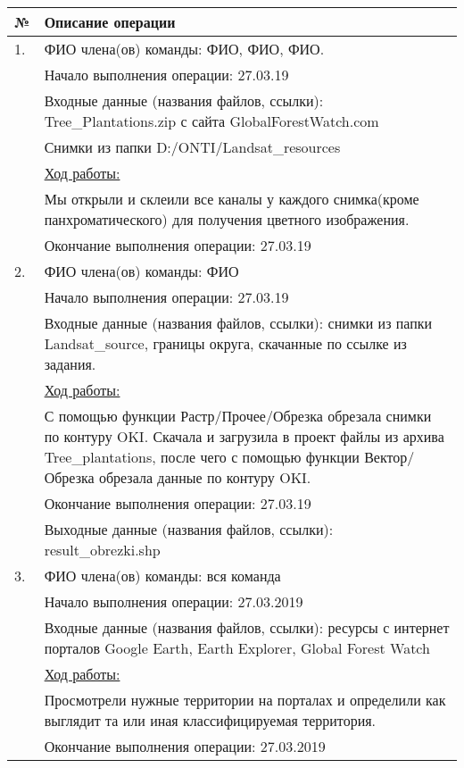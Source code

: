 \begin{center}
    \begin{longtable}{|l|p{14.5cm}|}
        \hline
        № & Описание операции \\
        \hline
        1. & ФИО члена(ов) команды: ФИО, ФИО, ФИО.\\
           & Начало выполнения операции: 27.03.19 \\
           & Входные данные (названия файлов, ссылки): Tree\_Plantations.zip с сайта GlobalForestWatch.com \\
           & Снимки из папки D:/ONTI/Landsat\_resources\\
           & \underline{Ход работы:} \\
           & Мы открыли и склеили все каналы у каждого снимка(кроме панхроматического) для получения цветного изображения. \\
           & Окончание выполнения операции: 27.03.19 \\
        \hline
        2. & ФИО члена(ов) команды: ФИО \\
           & Начало выполнения операции: 27.03.19 \\
           & Входные данные (названия файлов, ссылки): снимки из папки Landsat\_source, границы округа, скачанные по ссылке из задания. \\
           & \underline{Ход работы:} \\
           & С помощью функции Растр/Прочее/Обрезка обрезала снимки по контуру OKI. Скачала и загрузила в проект файлы из архива Tree\_plantations, после чего с помощью функции Вектор/Обрезка обрезала данные по контуру OKI. \\
           & Окончание выполнения операции: 27.03.19 \\
           & Выходные данные (названия файлов, ссылки): result\_obrezki.shp \\
        \hline
        3. & ФИО члена(ов) команды: вся команда \\
           & Начало выполнения операции: 27.03.2019 \\
           & Входные данные (названия файлов, ссылки): ресурсы с интернет порталов Google Earth, Earth Explorer, Global Forest Watch \\
           & \underline{Ход работы:} \\
           & Просмотрели нужные территории на порталах и определили как выглядит та или иная классифицируемая территория. \\
           & Окончание выполнения операции: 27.03.2019 \\

\end{longtable}
\end{center}
